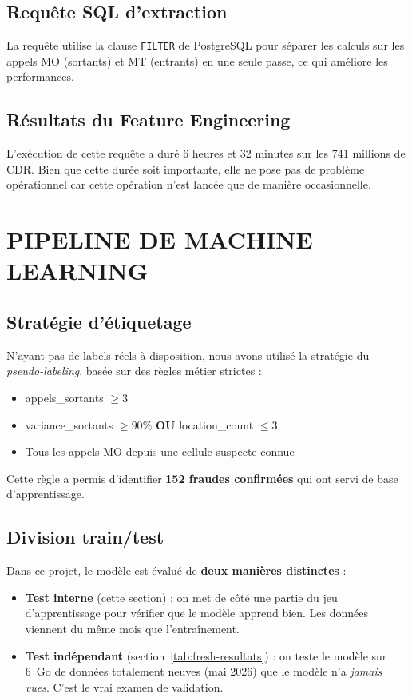 \documentclass[12pt, oneside, a4paper]{report}
\begin{document}
\subsection{Requête SQL d'extraction}
La requête utilise la clause \texttt{FILTER} de PostgreSQL pour séparer les calculs sur les appels MO (sortants) et MT (entrants) en une seule passe, ce qui améliore les performances.

\subsection{Résultats du Feature Engineering}
L'exécution de cette requête a duré 6 heures et 32 minutes sur les 741 millions de CDR. Bien que cette durée soit importante, elle ne pose pas de problème opérationnel car cette opération n'est lancée que de manière occasionnelle.

\section{PIPELINE DE MACHINE LEARNING}

\subsection{Stratégie d'étiquetage}
N'ayant pas de labels réels à disposition, nous avons utilisé la stratégie du \textit{pseudo-labeling}, basée sur des règles métier strictes :
\begin{itemize}
\item appels\_sortants $\geq 3$
\item variance\_sortants $\geq 90\%$ \textbf{OU} location\_count $\leq 3$
\item Tous les appels MO depuis une cellule suspecte connue
\end{itemize}

Cette règle a permis d'identifier \textbf{152 fraudes confirmées} qui ont servi de base d'apprentissage.

\subsection{Division train/test}

Dans ce projet, le modèle est évalué de \textbf{deux manières distinctes} :

\begin{itemize}
\item \textbf{Test interne} (cette section) : on met de côté une partie du jeu d'apprentissage pour vérifier que le modèle apprend bien. Les données viennent du même mois que l'entraînement.
\item \textbf{Test indépendant} (section~\ref{tab:fresh-resultats}) : on teste le modèle sur 6~Go de données totalement neuves (mai 2026) que le modèle n'a \emph{jamais vues}. C'est le vrai examen de validation.
\end{itemize}
\end{document}
